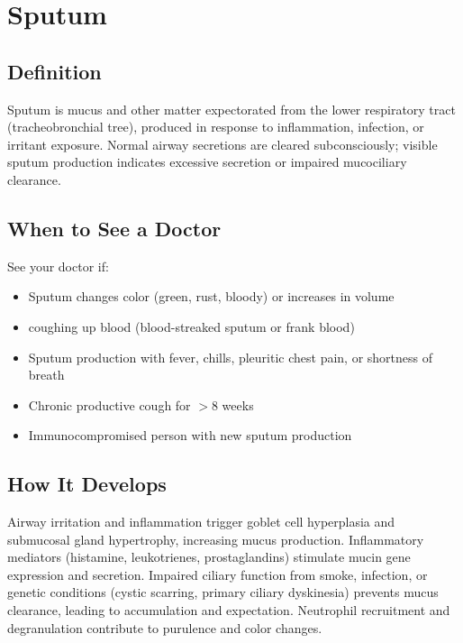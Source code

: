 \chapter{Sputum}

\section*{Definition}
Sputum is mucus and other matter expectorated from the lower respiratory tract (tracheobronchial tree), produced in response to inflammation, infection, or irritant exposure. Normal airway secretions are cleared subconsciously; visible sputum production indicates excessive secretion or impaired mucociliary clearance.

\section*{When to See a Doctor}
See your doctor if:
\begin{itemize}
  \item Sputum changes color (green, rust, bloody) or increases in volume
  \item coughing up blood (blood-streaked sputum or frank blood)
  \item Sputum production with fever, chills, pleuritic chest pain, or shortness of breath
  \item Chronic productive cough for $>$8 weeks
  \item Immunocompromised person with new sputum production
\end{itemize}

\section*{How It Develops}
Airway irritation and inflammation trigger goblet cell hyperplasia and submucosal gland hypertrophy, increasing mucus production. Inflammatory mediators (histamine, leukotrienes, prostaglandins) stimulate mucin gene expression and secretion. Impaired ciliary function from smoke, infection, or genetic conditions (cystic scarring, primary ciliary dyskinesia) prevents mucus clearance, leading to accumulation and expectation. Neutrophil recruitment and degranulation contribute to purulence and color changes.

